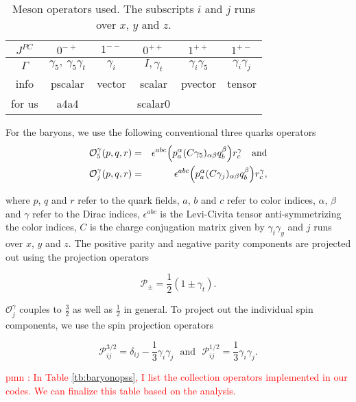 \documentclass[showkeys,aps,10pt,twocolumn,showpacs,preprintnumbers,amsmath,amssymb,prd,letterpaper,floatfix,nofootinbib,superscriptaddress,]{revtex4-1}
\newcommand\beq{\begin{equation}}
\newcommand\eeq[1]{\label{#1}\end{equation}}
\newcommand\beqa{\begin{eqnarray}}
\newcommand\eeqa[1]{\label{#1}\end{eqnarray}}
\newcommand\bet{\begin{table}}
\newcommand\eet[1]{\label{tb:#1}\end{table}}
\newcommand\nn{\nonumber}
\newcommand\tbn[1]{Table \ref{tb:#1}}
\newcommand\pmn[1]{\textcolor{red}{pmn : #1}}
\begin{document}
\bet[h]
\centering
\begin{tabular}{c|c|c|c|c|c}
\hline
$J^{PC}$ &          $0^{-+}$             &   $1^{--}$ &    $0^{++}$   &   $1^{++}$          & $1^{+-}$            \\\hline
$\Gamma$ & $\gamma_5, ~\gamma_5\gamma_t$ & $\gamma_i$ & $I, \gamma_t$ & $\gamma_i \gamma_5$ & $\gamma_i \gamma_j$ \\\hline
info     &  pscalar                      &  vector    &   scalar      &    pvector          & tensor              \\
for us   &  a4a4                         &            &   scalar0     &                     &                     \\
\hline
\end{tabular}
\caption{Meson operators used. The subscripts $i$ and $j$ runs over $x$, $y$ and $z$.}
\eet{mesonops}

For the baryons, we use the following conventional three quarks operators 
\beqa
\nn \mathcal{O}_{5}^{\gamma}(p, q, r) &=& \epsilon^{abc} \Bigl(p_a^{\alpha} (C \gamma_5)_{\alpha\beta} q_b^{\beta}\Bigr) r_c^{\gamma}\mbox{\quad and} \\
\mathcal{O}_{j}^{\gamma}(p, q, r) &=& \epsilon^{abc} \Bigl(p_a^{\alpha} (C \gamma_j)_{\alpha\beta} q_b^{\beta}\Bigr) r_c^{\gamma}, 
\eeqa{baryonops} 

where $p$, $q$ and $r$ refer to the quark fields, $a$, $b$ and $c$ refer to color indices, $\alpha$,
$\beta$ and $\gamma$ refer to the Dirac indices, $\epsilon^{abc}$ is the Levi-Civita tensor 
anti-symmetrizing the color indices, $C$ is the charge conjugation matrix given by $\gamma_t\gamma_y$
and $j$ runs over  $x$, $y$ and $z$. The positive parity and negative parity components are projected 
out using the projection operators 

\beq
\mathcal{P}_{\pm} = \frac12(1\pm\gamma_t).
\eeq{parityproj}

$\mathcal{O}_{j}^{\gamma}$ couples to $\frac32$ as well as $\frac12$ in general. To project out the
individual spin components, we use the spin projection operators \cite{Bowler:1996ws}

\beq
\mathcal{P}^{3/2}_{ij} = \delta_{ij} - \frac13\gamma_i\gamma_j \mbox{ ~and~ } \mathcal{P}^{1/2}_{ij} = \frac13\gamma_i\gamma_j.
\eeq{spinproj}

\pmn{In \tbn{baryonopss}, I list the collection operators implemented in our codes. We can finalize 
this table based on the analysis.}
\end{document}
